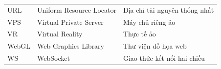 \documentclass[../DoAn.tex]{subfiles}
\begin{document}
\begin{longtable}{l p{6cm} p{7cm}}
    URL     & Uniform Resource Locator           & Địa chỉ tài nguyên thống nhất \\[3pt]
    VPS     & Virtual Private Server             & Máy chủ riêng ảo \\[3pt]
    VR      & Virtual Reality                    & Thực tế ảo \\[3pt]
    WebGL   & Web Graphics Library               & Thư viện đồ họa web \\[3pt]
    WS      & WebSocket                          & Giao thức kết nối hai chiều \\
    \hline
\end{longtable}
\end{document}
